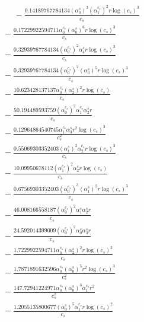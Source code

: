 \documentclass[10pt]{article}
\begin{document}
\begin{align*}
\phantom{R_{3,8}} &\phantom{={}}{}  - \frac{0.14189767784134 \left(\alpha_{0}^s\right)^{3} \left(\alpha_{1}^{c_s}\right)^{2} r \log{\left(c_{s} \right)}^{3}}{c_{s}} \\
&{}  - \frac{0.17229922594711 \alpha_{0}^{c_s} \left(\alpha_{0}^s\right)^{6} r \log{\left(c_{s} \right)}^{3}}{c_{s}} \\
&{}  - \frac{0.32939767784134 \left(\alpha_{0}^{c_s}\right)^{2} \alpha_{4}^s r \log{\left(c_{s} \right)}^{3}}{c_{s}} \\
&{}  - \frac{0.32939767784134 \left(\alpha_{0}^{c_s}\right)^{2} \left(\alpha_{0}^s\right)^{5} r \log{\left(c_{s} \right)}^{3}}{c_{s}} \\
&{}  - \frac{10.623428137137 \alpha_{0}^{c_s} \left(\alpha_{2}^s\right)^{2} r \log{\left(c_{s} \right)}}{c_{s}} \\
&{}  - \frac{50.194489593759 \left(\alpha_{0}^{c_s}\right)^{2} \alpha_{1}^{c_s} \alpha_{2}^s r}{c_{s}} \\
&{}  - \frac{0.12964864540745 \alpha_{1}^{c_s} \alpha_{3}^s r^{2} \log{\left(c_{s} \right)}^{3}}{c_{s}^{2}} \\
&{}  - \frac{0.55069303352403 \left(\alpha_{1}^s\right)^{2} \alpha_{2}^{c_s} r \log{\left(c_{s} \right)}^{3}}{c_{s}} \\
&{}  - \frac{10.09950678112 \left(\alpha_{1}^{c_s}\right)^{2} \alpha_{2}^s r \log{\left(c_{s} \right)}}{c_{s}} \\
&{}  - \frac{0.67569303352403 \left(\alpha_{0}^{c_s}\right)^{3} \left(\alpha_{1}^s\right)^{2} r \log{\left(c_{s} \right)}^{3}}{c_{s}} \\
&{}  - \frac{46.008166558187 \left(\alpha_{0}^{c_s}\right)^{2} \alpha_{1}^s \alpha_{2}^s r}{c_{s}} \\
&{}  - \frac{24.592014399009 \left(\alpha_{0}^{c_s}\right)^{2} \alpha_{0}^s \alpha_{3}^s r}{c_{s}} \\
&{}  - \frac{1.7229922594711 \alpha_{0}^{c_s} \left(\alpha_{2}^s\right)^{2} r \log{\left(c_{s} \right)}^{3}}{c_{s}} \\
&{}  - \frac{1.7871891632596 \alpha_{0}^{c_s} \left(\alpha_{0}^s\right)^{5} r^{2} \log{\left(c_{s} \right)}^{3}}{c_{s}^{2}} \\
&{}  - \frac{147.72941224971 \alpha_{0}^{c_s} \left(\alpha_{0}^s\right)^{3} \alpha_{1}^{c_s} r^{2}}{c_{s}^{2}} \\
&{}  - \frac{1.2055135800677 \left(\alpha_{0}^s\right)^{5} \alpha_{1}^{c_s} r \log{\left(c_{s} \right)}^{2}}{c_{s}} \\

\end{align*}
\end{document}
